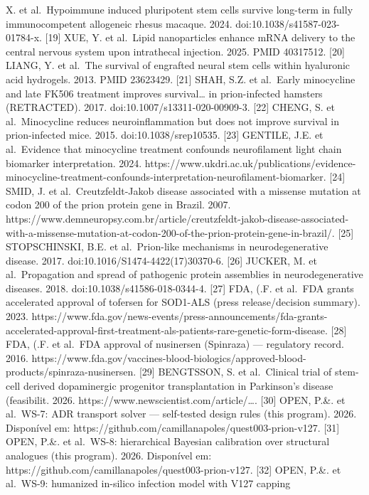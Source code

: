 \documentclass[
  12pt,
]{report}
\begin{document}
X. et al.~Hypoimmune induced pluripotent stem cells survive long-term in
fully immunocompetent allogeneic rhesus macaque. 2024.
doi:10.1038/s41587-023-01784-x. {[}19{]} XUE, Y. et al.~Lipid
nanoparticles enhance mRNA delivery to the central nervous system upon
intrathecal injection. 2025. PMID 40317512. {[}20{]} LIANG, Y. et
al.~The survival of engrafted neural stem cells within hyaluronic acid
hydrogels. 2013. PMID 23623429. {[}21{]} SHAH, S.Z. et al.~Early
minocycline and late FK506 treatment improves survival\ldots{} in
prion-infected hamsters (RETRACTED). 2017.
doi:10.1007/s13311-020-00909-3. {[}22{]} CHENG, S. et al.~Minocycline
reduces neuroinflammation but does not improve survival in
prion-infected mice. 2015. doi:10.1038/srep10535. {[}23{]} GENTILE, J.E.
et al.~Evidence that minocycline treatment confounds neurofilament light
chain biomarker interpretation. 2024.
https://www.ukdri.ac.uk/publications/evidence-minocycline-treatment-confounds-interpretation-neurofilament-biomarker.
{[}24{]} SMID, J. et al.~Creutzfeldt-Jakob disease associated with a
missense mutation at codon 200 of the prion protein gene in Brazil.
2007.
https://www.demneuropsy.com.br/article/creutzfeldt-jakob-disease-associated-with-a-missense-mutation-at-codon-200-of-the-prion-protein-gene-in-brazil/.
{[}25{]} STOPSCHINSKI, B.E. et al.~Prion-like mechanisms in
neurodegenerative disease. 2017. doi:10.1016/S1474-4422(17)30370-6.
{[}26{]} JUCKER, M. et al.~Propagation and spread of pathogenic protein
assemblies in neurodegenerative diseases. 2018.
doi:10.1038/s41586-018-0344-4. {[}27{]} FDA, (.F. et al.~FDA grants
accelerated approval of tofersen for SOD1-ALS (press release/decision
summary). 2023.
https://www.fda.gov/news-events/press-announcements/fda-grants-accelerated-approval-first-treatment-als-patients-rare-genetic-form-disease.
{[}28{]} FDA, (.F. et al.~FDA approval of nusinersen (Spinraza) ---
regulatory record. 2016.
https://www.fda.gov/vaccines-blood-biologics/approved-blood-products/spinraza-nusinersen.
{[}29{]} BENGTSSON, S. et al.~Clinical trial of stem-cell derived
dopaminergic progenitor transplantation in Parkinson's disease
(feasibilit. 2026. https://www.newscientist.com/article/\ldots. {[}30{]}
OPEN, P.\&. et al.~WS-7: ADR transport solver --- self-tested design
rules (this program). 2026. Disponível em:
https://github.com/camillanapoles/quest003-prion-v127. {[}31{]} OPEN,
P.\&. et al.~WS-8: hierarchical Bayesian calibration over structural
analogues (this program). 2026. Disponível em:
https://github.com/camillanapoles/quest003-prion-v127. {[}32{]} OPEN,
P.\&. et al.~WS-9: humanized in-silico infection model with V127 capping
\end{document}

